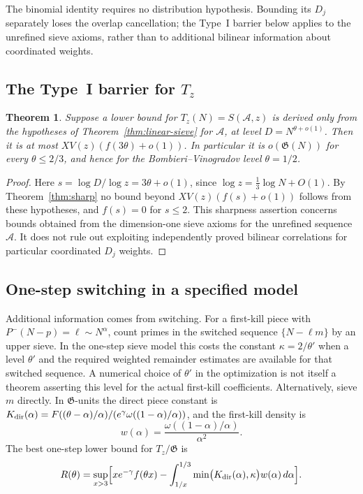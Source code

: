 \documentclass[final,11pt]{elsarticle}
\newtheorem{theorem}{Theorem}[section]
\theoremstyle{definition}
\theoremstyle{remark}
\newcommand{\GG}{\mathfrak{G}}
\newcommand{\Pm}{P^{-}}
\numberwithin{equation}{section}
\begin{document}
The binomial identity requires no distribution hypothesis. Bounding
its $D_j$ separately loses the overlap cancellation; the Type~I
barrier below applies to the unrefined sieve axioms, rather than to
additional bilinear information about coordinated weights.

\subsection{The Type~I barrier for \texorpdfstring{$T_z$}{Tz}}

\begin{theorem}\label{thm:typeI-barrier}
Suppose a lower bound for $T_z(N)=S(\mathcal A,z)$ is derived only from the hypotheses of Theorem~\ref{thm:linear-sieve} for $\mathcal A$, at level $D=N^{\theta+o(1)}$. Then it is at most $XV(z)(f(3\theta)+o(1))$. In particular it is $o(\GG(N))$ for every $\theta\le 2/3$, and hence for the Bombieri--Vinogradov level $\theta=1/2$.
\end{theorem}

\begin{proof}
Here $s=\log D/\log z=3\theta+o(1)$, since $\log z=\frac13\log N+O(1)$. By Theorem~\ref{thm:sharp} no bound beyond $XV(z)(f(s)+o(1))$ follows from these hypotheses, and $f(s)=0$ for $s\le2$. This sharpness assertion concerns bounds obtained from the dimension-one sieve axioms for the unrefined sequence $\mathcal A$. It does not rule out exploiting independently proved bilinear correlations for particular coordinated $D_j$ weights. \qedhere
\end{proof}

\subsection{One-step switching in a specified model}

Additional information comes from switching. For a first-kill piece with $\Pm(N-p)=\ell\sim N^\alpha$, count primes in the switched sequence $\{N-\ell m\}$ by an upper sieve. In the one-step sieve model this costs the constant $\kappa=2/\theta'$ when a level $\theta'$ and the required weighted remainder estimates are available for that switched sequence. A numerical choice of $\theta'$ in the optimization is not itself a theorem asserting this level for the actual first-kill coefficients. Alternatively, sieve $m$ directly. In $\GG$-units the direct piece constant is $K_{\rm dir}(\alpha)=F((\theta-\alpha)/\alpha)/(e^\gamma\omega((1-\alpha)/\alpha))$, and the first-kill density is
\[
w(\alpha)=\frac{\omega((1-\alpha)/\alpha)}{\alpha^2}.
\]
The best one-step lower bound for $T_z/\GG$ is
\[
R(\theta)=\sup_{x>3}\Bigl[xe^{-\gamma}f(\theta x)-\int_{1/x}^{1/3}\min\bigl(K_{\rm dir}(\alpha),\kappa\bigr)w(\alpha)\,d\alpha\Bigr].
\]
\end{document}
